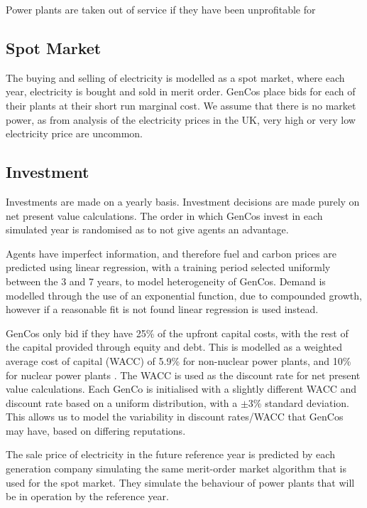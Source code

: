 Power plants are taken out of service if they have been unprofitable for 


\subsection{Spot Market}

The buying and selling of electricity is modelled as a spot market, where each year, electricity is bought and sold in merit order. GenCos place bids for each of their plants at their short run marginal cost. We assume that there is no market power, as from analysis of the electricity prices in the UK, very high or very low electricity price are uncommon.

\subsection{Investment}

Investments are made on a yearly basis. Investment decisions are made purely on net present value calculations. The order in which GenCos invest in each simulated year is randomised as to not give agents an advantage.

Agents have imperfect information, and therefore fuel and carbon prices are predicted using linear regression, with a training period selected uniformly between the 3 and 7 years, to model heterogeneity of GenCos. Demand is modelled through the use of an exponential function, due to compounded growth, however if a reasonable fit is not found linear regression is used instead.

GenCos only bid if they have 25\% of the upfront capital costs, with the rest of the capital provided through equity and debt. This is modelled as a weighted average cost of capital (WACC) of 5.9\% for non-nuclear power plants, and 10\% for nuclear power plants \cite{KPMG2017, Paper2012}. The WACC is used as the discount rate for net present value calculations. Each GenCo is initialised with a slightly different WACC and discount rate based on a uniform distribution, with a $\pm$3\% standard deviation. This allows us to model the variability in discount rates/WACC that GenCos may have, based on differing reputations.

The sale price of electricity in the future reference year is predicted by each generation company simulating the same merit-order market algorithm that is used for the spot market. They simulate the behaviour of power plants that will be in operation by the reference year.


